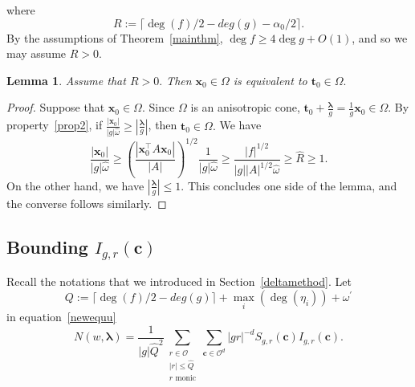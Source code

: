 \documentclass[10pt]{amsart}
\theoremstyle{plain}
\theoremstyle{plain}
\newtheorem{lemma}[theorem]{Lemma}
\renewcommand{\vec}[1]{\mathbf{#1}}
\theoremstyle{remark}
\theoremstyle{definition}
\renewcommand{\hat}{\widehat}
\newcommand{\hQ}{\widehat{Q}}
\newcommand{\cO}{\mathcal{O}}
\begin{document}
where 
\begin{equation}\label{R}R:= \lceil{\deg(f)/2} -deg(g)-\alpha_0/2\rceil.\end{equation}
By the assumptions of Theorem~\ref{mainthm}, $\deg f \geq 4\deg g +O(1)$, and so we may assume $R>0.$
\begin{lemma}\label{t0}
Assume that $R>0.$ Then $\vec{x}_0\in \Omega$ is equivalent to $\vec{t}_0\in \Omega.$
\end{lemma}
\begin{proof} Suppose that  $\vec{x}_0\in \Omega.$ Since $\Omega$ is an anisotropic cone, 
\(
\vec{t}_0+\frac{\boldsymbol{\lambda}}{g}= \frac{1}{g}\vec{x}_0 \in \Omega
\). By property~\eqref{prop2}, if $\frac{|\vec{x}_0|}{|g|\hat{\omega}} \geq |\frac{\boldsymbol{\lambda}}{g}|$, then $\vec{t}_0\in \Omega.$  We have 
\[
\frac{|\vec{x}_0|}{|g|\hat{\omega}}  \geq  \left( \frac{|\vec{x}_0^{\intercal}A\vec{x}_0|}{|A|}\right)^{1/2}\frac{1}{|g|\hat{\omega}} \geq
\frac{|f|^{1/2}}{|g||A|^{1/2}\hat{\omega}}\geq \hat{R}\geq 1.
\]
On the other hand, we have $ |\frac{\boldsymbol{\lambda}}{g}| \leq 1.$ This concludes one side of the lemma, and the converse  follows similarly. 

\end{proof}



\subsection{Bounding $I_{g,r}(\vec{c})$}
Recall the notations that we introduced in Section~\ref{deltamethod}.  Let
\begin{equation}\label{defQ}
Q:=  \lceil{\deg(f)/2} -deg(g)\rceil +\max_{i}(\deg(\eta_i))+\omega^{\prime}
\end{equation} in equation~\eqref{newequu}
\[N(w,\boldsymbol{\lambda})=\frac{1}{|g|\hQ^2}\sum_{\substack{
r\in \cO\\
|r|\leq \hat Q\\
\text{$r$ monic}
} }\sum_{\vec{c}\in\mathcal{O}^d}|gr|^{-d}S_{g,r}(\vec{c})I_{g,r}(\vec{c}).\]
\end{document}

